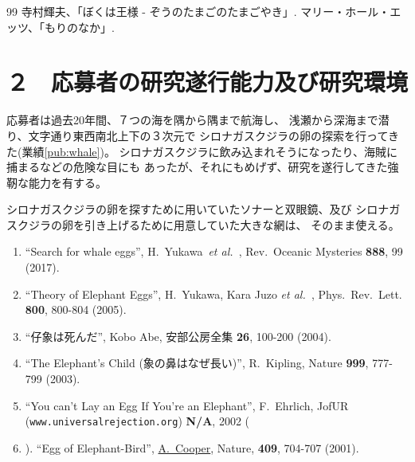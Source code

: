 \documentclass[11pt,a4paper,uplatex,dvipdfmx]{ujarticle} 		%
\newcommand{\研究課題名}{象の卵}
\newcommand{\研究機関名}{逢坂大学}
\newcommand{\研究代表者氏名}{湯川秀樹}
\newcommand{\研究期間の最終元号年度}{12}  %
\newcommand{\paper}[6]{%
	\item ``#1'', #2, #3 {\bf #4}, #5 (#6).			%
}
\newcommand{\etal}{\textit{et al.\ }}
\newcommand{\yukawa}{H.~Yukawa}					%
\newcommand{\prl}{Phys.\ Rev.\ Lett.\ }		%
\begin{document}
\vspace*{1zw}
\begin{thebibliography}{99}
	 寺村輝夫、「ぼくは王様 - ぞうのたまごのたまごやき」.
	 マリー・ホール・エッツ、「もりのなか」.
\end{thebibliography}




\section{２　応募者の研究遂行能力及び研究環境}

\PapersInstructions		%
	応募者は過去20年間、７つの海を隅から隅まで航海し、
	浅瀬から深海まで潜り、文字通り東西南北上下の３次元で
	シロナガスクジラの卵の探索を行ってきた(業績\ref{pub:whale})。		%
	シロナガスクジラに飲み込まれそうになったり、海賊に捕まるなどの危険な目にも
	あったが、それにもめげず、研究を遂行してきた強靭な能力を有する。

	シロナガスクジラの卵を探すために用いていたソナーと双眼鏡、及び
	シロナガスクジラの卵を引き上げるために用意していた大きな網は、
	そのまま使える。
	\begin{enumerate}
		\paper{Search for whale eggs}{\yukawa\ \etal}{Rev.\ Oceanic Mysteries}{888}{99}{2017}
			\label{pub:whale}
				
		\paper{Theory of Elephant Eggs}{\yukawa, Kara Juzo \etal}{\prl}{800}{800-804}{2005}
			\label{pub:theoegg}
				
		\paper{仔象は死んだ}{Kobo Abe}{安部公房全集}{26}{100-200}{2004}
		
		\paper{The Elephant's Child (象の鼻はなぜ長い)}{R.~Kipling}{Nature}{999}{777-799}{2003}

		\paper{You can't Lay an Egg If You're an Elephant}{F.~Ehrlich}
			{JofUR\\({\tt www.universalrejection.org})}{{\bf N/A}}{2002}
		
		\item ``Egg of Elephant-Bird'', 
				\underline{A.~Cooper},
				Nature, {\bf 409}, 704-707 (2001).	%
	\end{enumerate}
\end{document}
